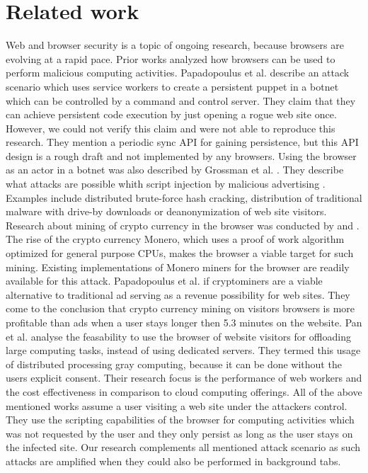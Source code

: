 \documentclass[
	ruledheaders=section,%
	class=report,%
	thesis={type=bachelor},%
	accentcolor=9c,%
	custommargins=true,%
	marginpar=false,%
	parskip=half-,%
	fontsize=11pt,%
]{tudapub}
\begin{document}
  

  
  \newpage
  \chapter{Related work}

  Web and browser security is a topic of ongoing research, because browsers are evolving at a rapid pace. Prior works analyzed how browsers can be used to perform malicious computing activities. Papadopoulus et al. \cite{papadopoulos2018master} describe an attack scenario which uses service workers to create a persistent puppet in a botnet which can be controlled by a command and control server. They claim that they can achieve persistent code execution by just opening a rogue web site once. However, we could not verify this claim and were not able to reproduce this research. They mention a periodic sync API for gaining persistence, but this API design is a rough draft and not implemented by any browsers. Using the browser as an actor in a botnet was also described by Grossman et al. \cite{grossmann2013million}. They describe what attacks are possible whith script injection by malicious advertising \cite{wiki:malvertising}. Examples include distributed brute-force hash cracking, distribution of traditional malware with drive-by downloads or deanonymization of web site visitors. Research about mining of crypto currency in the browser was conducted by \cite{eskandari2018first} and \cite{rueth2018digging}. The rise of the crypto currency Monero, which uses a proof of work algorithm optimized for general purpose CPUs, makes the browser a viable target for such mining. Existing implementations of Monero miners for the browser are readily available for this attack. Papadopoulus et al. \cite{papadopoulos2018truth} if cryptominers are a viable alternative to traditional ad serving as a revenue possibility for web sites. They come to the conclusion that crypto currency mining on visitors browsers is more profitable than ads when a user stays longer then 5.3 minutes on the website. Pan et al. \cite{pan2015gray} analyse the feasability to use the browser of website visitors for offloading large computing tasks, instead of using dedicated servers. They termed this usage of distributed processing gray computing, because it can be done without the users explicit consent. Their research focus is the performance of web workers and the cost effectiveness in comparison to cloud computing offerings. All of the above mentioned works assume a user visiting a web site under the attackers control. They use the scripting capabilities of the browser for computing activities which was not requested by the user and they only persist as long as the user stays on the infected site. Our research complements all mentioned attack scenario as such attacks are amplified when they could also be performed in background tabs. 
\end{document}
